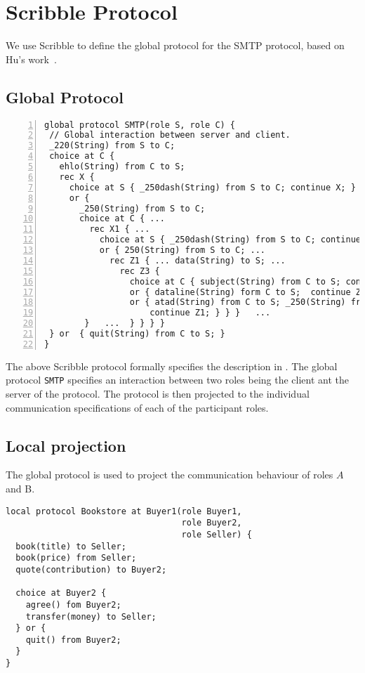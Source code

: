 \section{Scribble Protocol}

We use Scribble to define the global
protocol for the SMTP protocol, based
on Hu's work~\cite{HuR:smtp}.

\subsection{Global Protocol}

%
\begin{lstlisting}[numbers=left]
global protocol SMTP(role S, role C) {
 // Global interaction between server and client.
 _220(String) from S to C;
 choice at C {
   ehlo(String) from C to S;
   rec X {
     choice at S { _250dash(String) from S to C; continue X; }
     or {
       _250(String) from S to C;
       choice at C { ...
         rec X1 { ...
           choice at S { _250dash(String) from S to C; continue X1; }
           or { 250(String) from S to C; ... 
             rec Z1 { ... data(String) to S; ...
               rec Z3 {
                 choice at C { subject(String) from C to S; continue Z3; }
                 or { dataline(String) form C to S;  continue Z3; }
                 or { atad(String) from C to S; _250(String) from S to C; 
                     continue Z1; } } }   ...
        }   ...  } } } }
 } or  { quit(String) from C to S; }
}
\end{lstlisting}


The above Scribble protocol formally specifies
the description in .
The global protocol \lstinline|SMTP| specifies
an interaction between two roles being the client ant the server of the protocol.
The protocol is then projected to the
individual communication specifications of each 
of the participant roles.



\subsection{Local projection}
The global protocol is used to project the communication
behaviour of roles $A$ and B.


\begin{lstlisting}[caption={Local Protocol for Role \BuyerOne}]
local protocol Bookstore at Buyer1(role Buyer1,
                                   role Buyer2,
                                   role Seller) {
  book(title) to Seller;
  book(price) from Seller;
  quote(contribution) to Buyer2;

  choice at Buyer2 {
    agree() fom Buyer2;
    transfer(money) to Seller;
  } or {
    quit() from Buyer2;
  }
}
\end{lstlisting}

